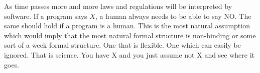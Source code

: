 \documentclass{article}
\begin{document}
As time passes more and more laws and regulations will be interpreted by
software. If a program says \(X\), a human always needs to be able to say NO.
The same should hold if a program is a human. This is the most natural assumption
which would imply that the most natural formal structure is non-binding or
some sort of a week formal structure. One that is flexible. One which can easily
be ignored. That is science. You have X and you just assume not X and see where
it goes. 
\end{document}
